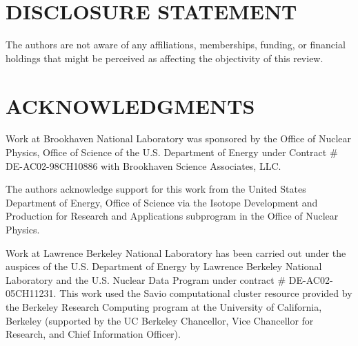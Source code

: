 \documentclass[letterpaper]{ar-1col}
\begin{document}
% 
% 

\section*{DISCLOSURE STATEMENT}
The authors are not aware of any affiliations, memberships, funding, or financial holdings that
might be perceived as affecting the objectivity of this review. 

\section*{ACKNOWLEDGMENTS}
Work at Brookhaven National Laboratory was sponsored by the Office of Nuclear Physics, Office of Science of the U.S. Department of Energy under Contract \# DE-AC02-98CH10886 with Brookhaven Science Associates, LLC.

The authors acknowledge support for this work from the United States Department of Energy, Office of Science via the Isotope Development and Production for Research and Applications subprogram in the Office of Nuclear Physics. 

Work at Lawrence Berkeley National Laboratory has been carried out  under the auspices of the U.S. Department of Energy by  Lawrence Berkeley National Laboratory and the U.S. Nuclear Data Program under contract \# DE-AC02-05CH11231.
This work used the Savio computational cluster resource provided by the Berkeley Research Computing program at the University of California, Berkeley (supported by the UC Berkeley Chancellor, Vice Chancellor for Research, and Chief Information Officer).
\end{document}
